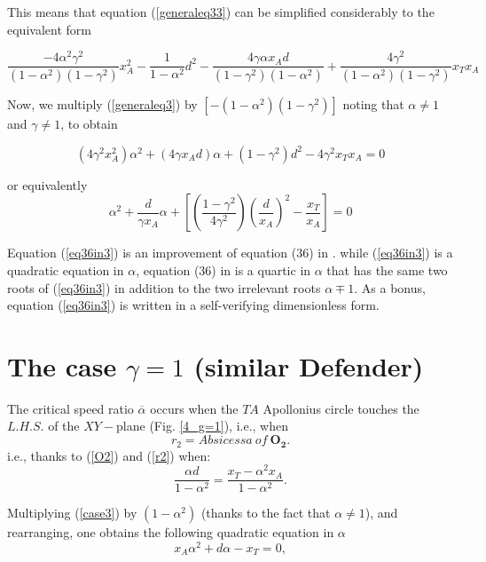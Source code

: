 This means that equation (\ref{generaleq33}) can be simplified considerably to the equivalent form

\begin{equation}
\dfrac{-4 \alpha^{2}\gamma^{2}}{(1-\alpha^{2})(1-\gamma^{2})}x_{A}^{2}
-\dfrac{1}{1-\alpha^{2}}d^{2}
-\dfrac{4\gamma\alpha x_{A}d}{(1-\gamma^{2})(1-\alpha^{2})}
+\dfrac{4\gamma^{2}}{(1-\alpha^{2})(1-\gamma^{2})}x_{T}x_{A}
\label{generaleq3}
\end{equation}

Now, we multiply (\ref{generaleq3}) by $[-(1-\alpha^{2})(1-\gamma^{2})]$ noting that $\alpha\neq1$ and $\gamma\neq1$, to obtain

\begin{equation}
(4\gamma^{2}x_{A}^{2})\alpha^{2} + (4\gamma x_{A}d)\alpha + (1-\gamma^{2})d^{2} - 4\gamma^{2} x_{T} x_{A}=0
\label{generaleq4}
\end{equation}


or equivalently 
\begin{equation}
\boxed{
\alpha^{2}+\dfrac{d}{\gamma x_{A}}\alpha +[(\dfrac{1-\gamma^{2}}{4\gamma^{2}})(\dfrac{d}{x_{A}})^{2}-\dfrac{x_{T}}{x_{A}}]=0}
\label{eq36in3}
\end{equation}

Equation (\ref{eq36in3}) is an improvement of equation (36) in \cite{garcia2015escape}.
while (\ref{eq36in3}) is a quadratic equation in $\alpha$, equation (36) in \cite{garcia2015escape} is a quartic in $\alpha$ that has the same  two roots of (\ref{eq36in3}) in addition to the two irrelevant roots $\alpha\mp1$. As a bonus, equation (\ref{eq36in3}) is written in a self-verifying dimensionless form.

\section{The case $\gamma=1$ (similar Defender)}
The critical speed ratio $\overline{\alpha}$ occurs when the $TA$ Apollonius circle touches the $L.H.S.$ of the $XY-$plane (Fig. \ref{4_g=1}), i.e., when
\begin{equation}
r_{2}= Absicessa\ of\ \boldsymbol{O_{2}}.
\end{equation} 
i.e., thanks to (\ref{O2}) and (\ref{r2}) when:
\begin{equation}
\dfrac{\alpha d}{1-\alpha^{2}}=\dfrac{x_{T}-\alpha^{2}x_{A}}{1-\alpha^{2}}.
\label{case3}
\end{equation}

Multiplying (\ref{case3}) by $(1-\alpha^{2})$ (thanks to the fact that $\alpha\neq1$), and rearranging, one obtains the following quadratic equation in $\alpha$
\begin{equation}
x_{A} \alpha^{2} + d \alpha - x_{T}=0,
\label{case3_SD}
\end{equation}

